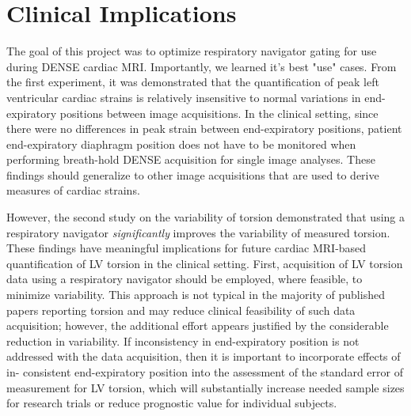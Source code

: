 	
\section{Clinical Implications}
	The goal of this project was to optimize respiratory navigator gating for use during DENSE cardiac MRI. Importantly, we learned it's best "use" cases. From the first experiment, it was demonstrated that the quantification of peak left ventricular cardiac strains is relatively insensitive to normal variations in end-expiratory positions between image acquisitions. In the clinical setting, since there were no differences in peak strain between end-expiratory positions, patient end-expiratory diaphragm position does not have to be monitored when performing breath-hold DENSE acquisition for single image analyses. These findings should generalize to other image acquisitions that are used to derive measures of cardiac strains.
	
	However, the second study on the variability of torsion demonstrated that using a respiratory navigator \textit{significantly} improves the variability of measured torsion. These findings have meaningful implications for future cardiac MRI-based quantification of LV torsion in the clinical setting. First, acquisition of LV torsion data using a respiratory navigator should be employed, where feasible, to minimize variability. This approach is not typical in the majority of published papers reporting torsion and may reduce clinical feasibility of such data acquisition; however, the additional effort appears justified by the considerable reduction in variability. If inconsistency in end-expiratory position is not addressed with the data acquisition, then it is important to incorporate effects of in- consistent end-expiratory position into the assessment of the standard error of measurement for LV torsion, which will substantially increase needed sample sizes for research trials or reduce prognostic value for individual subjects.
	
	
